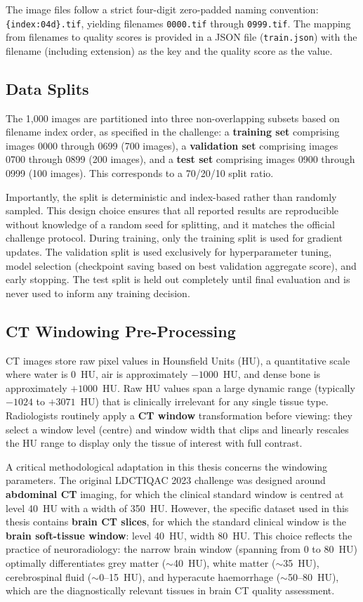 The image files follow a strict four-digit zero-padded naming convention:
\texttt{\{index:04d\}.tif}, yielding filenames \texttt{0000.tif} through
\texttt{0999.tif}. The mapping from filenames to quality scores is provided in a JSON
file (\texttt{train.json}) with the filename (including extension) as the key and the
quality score as the value.

\subsection{Data Splits}

The 1,000 images are partitioned into three non-overlapping subsets based on filename
index order, as specified in the challenge: a \textbf{training set} comprising images
0000 through 0699 (700 images), a \textbf{validation set} comprising images 0700 through
0899 (200 images), and a \textbf{test set} comprising images 0900 through 0999
(100 images). This corresponds to a 70/20/10 split ratio.

Importantly, the split is deterministic and index-based rather than randomly sampled.
This design choice ensures that all reported results are reproducible without knowledge
of a random seed for splitting, and it matches the official challenge protocol. During
training, only the training split is used for gradient updates. The validation split is
used exclusively for hyperparameter tuning, model selection (checkpoint saving based on
best validation aggregate score), and early stopping. The test split is held out
completely until final evaluation and is never used to inform any training decision.

\subsection{CT Windowing Pre-Processing}

CT images store raw pixel values in Hounsfield Units (HU), a quantitative scale where
water is 0~HU, air is approximately $-1000$~HU, and dense bone is approximately
$+1000$~HU. Raw HU values span a large dynamic range (typically $-1024$ to $+3071$~HU)
that is clinically irrelevant for any single tissue type. Radiologists routinely apply a
\textbf{CT window} transformation before viewing: they select a window level (centre)
and window width that clips and linearly rescales the HU range to display only the tissue
of interest with full contrast.

A critical methodological adaptation in this thesis concerns the windowing parameters.
The original LDCTIQAC 2023 challenge was designed around \textbf{abdominal CT} imaging,
for which the clinical standard window is centred at level 40~HU with a width of
350~HU. However, the specific dataset used in this thesis contains \textbf{brain CT
slices}, for which the standard clinical window is the \textbf{brain soft-tissue window}:
level 40~HU, width 80~HU. This choice reflects the practice of neuroradiology: the
narrow brain window (spanning from 0 to 80~HU) optimally differentiates grey matter
($\sim$40~HU), white matter ($\sim$35~HU), cerebrospinal fluid ($\sim$0--15~HU), and
hyperacute haemorrhage ($\sim$50--80~HU), which are the diagnostically relevant tissues
in brain CT quality assessment.

